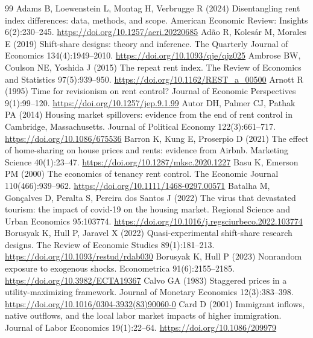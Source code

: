 \begin{thebibliography}{99}\small\setlength{\itemsep}{0pt}\setlength{\parskip}{0pt}
 Adams B, Loewenstein L, Montag H, Verbrugge R (2024) Disentangling rent index differences: data, methods, and scope. American Economic Review: Insights 6(2):230--245. \url{https://doi.org/10.1257/aeri.20220685}
 Ad\~{a}o R, Koles\'{a}r M, Morales E (2019) Shift-share designs: theory and inference. The Quarterly Journal of Economics 134(4):1949--2010. \url{https://doi.org/10.1093/qje/qjz025}
 Ambrose BW, Coulson NE, Yoshida J (2015) The repeat rent index. The Review of Economics and Statistics 97(5):939--950. \url{https://doi.org/10.1162/REST_a_00500}
 Arnott R (1995) Time for revisionism on rent control? Journal of Economic Perspectives 9(1):99--120. \url{https://doi.org/10.1257/jep.9.1.99}
 Autor DH, Palmer CJ, Pathak PA (2014) Housing market spillovers: evidence from the end of rent control in Cambridge, Massachusetts. Journal of Political Economy 122(3):661--717. \url{https://doi.org/10.1086/675536}
 Barron K, Kung E, Proserpio D (2021) The effect of home-sharing on house prices and rents: evidence from Airbnb. Marketing Science 40(1):23--47. \url{https://doi.org/10.1287/mksc.2020.1227}
 Basu K, Emerson PM (2000) The economics of tenancy rent control. The Economic Journal 110(466):939--962. \url{https://doi.org/10.1111/1468-0297.00571}
 Batalha M, Gonçalves D, Peralta S, Pereira dos Santos J (2022) The virus that devastated tourism: the impact of covid-19 on the housing market. Regional Science and Urban Economics 95:103774. \url{https://doi.org/10.1016/j.regsciurbeco.2022.103774}
 Borusyak K, Hull P, Jaravel X (2022) Quasi-experimental shift-share research designs. The Review of Economic Studies 89(1):181--213. \url{https://doi.org/10.1093/restud/rdab030}
 Borusyak K, Hull P (2023) Nonrandom exposure to exogenous shocks. Econometrica 91(6):2155--2185. \url{https://doi.org/10.3982/ECTA19367}
 Calvo GA (1983) Staggered prices in a utility-maximizing framework. Journal of Monetary Economics 12(3):383--398. \url{https://doi.org/10.1016/0304-3932(83)90060-0}
 Card D (2001) Immigrant inflows, native outflows, and the local labor market impacts of higher immigration. Journal of Labor Economics 19(1):22--64. \url{https://doi.org/10.1086/209979}

\end{thebibliography}
